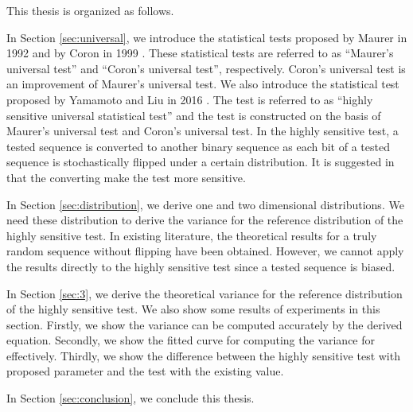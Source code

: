This thesis is organized as follows. 
%
\par
%
In Section \ref{sec:universal}, we introduce the statistical tests proposed by Maurer in 1992 \cite{maurer1992universal} and by Coron in 1999 \cite{coron1999security}. These statistical tests are referred to as ``Maurer's universal test'' and ``Coron's universal test'', respectively. 
Coron's universal test is an improvement of Maurer's universal test.
%
We also introduce the statistical test proposed by Yamamoto and Liu in 2016 \cite{yamamoto2016highly}. The test is referred to as ``highly sensitive universal statistical test'' and the test is constructed on the basis of Maurer's universal test and Coron's universal test.
%
In the highly sensitive test, a tested sequence is converted to another binary sequence as each bit of a tested sequence is stochastically flipped under a certain distribution.
%
It is suggested in \cite{yamamoto2016highly} that the converting make the test more sensitive.
%
\par
In Section \ref{sec:distribution}, we derive one and two dimensional distributions. We need these distribution to derive the variance for the reference distribution of the highly sensitive test. In existing literature, the theoretical results for a truly random sequence without flipping have been obtained. However, we cannot apply the results directly to the highly sensitive test since a tested sequence is biased.
%
\par
In Section \ref{sec:3}, we derive the theoretical variance for the reference distribution of the highly sensitive test. 
We also show some results of experiments in this section. 
Firstly, we show the variance can be computed accurately by the derived equation. 
Secondly, we show the fitted curve for computing the variance for effectively. 
Thirdly, we show the difference between the highly sensitive test with proposed parameter and the test with the existing value. 
%
\par
In Section \ref{sec:conclusion}, we conclude this thesis.